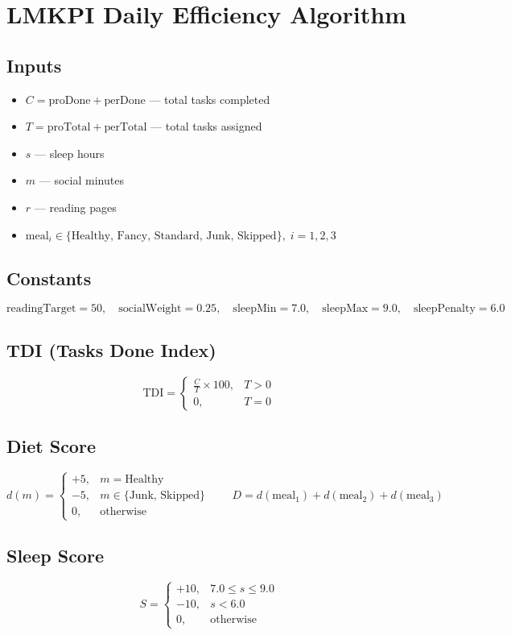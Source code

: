 \documentclass{article}
\begin{document}
\section*{LMKPI Daily Efficiency Algorithm}

\subsection*{Inputs}
\begin{itemize}
  \item $C = \text{proDone} + \text{perDone}$ — total tasks completed
  \item $T = \text{proTotal} + \text{perTotal}$ — total tasks assigned
  \item $s$ — sleep hours
  \item $m$ — social minutes
  \item $r$ — reading pages
  \item $\text{meal}_i \in \{\text{Healthy, Fancy, Standard, Junk, Skipped}\},\; i = 1,2,3$
\end{itemize}

\subsection*{Constants}
\[
\text{readingTarget} = 50,\quad \text{socialWeight} = 0.25,\quad \text{sleepMin} = 7.0,\quad \text{sleepMax} = 9.0,\quad \text{sleepPenalty} = 6.0
\]

\subsection*{TDI (Tasks Done Index)}
\[
\text{TDI} = \begin{cases}
\displaystyle\frac{C}{T} \times 100, & T > 0 \\[8pt]
0, & T = 0
\end{cases}
\]

\subsection*{Diet Score}
\[
d(m) = \begin{cases}
+5, & m = \text{Healthy} \\
-5, & m \in \{\text{Junk, Skipped}\} \\
0, & \text{otherwise}
\end{cases}
\qquad
D = d(\text{meal}_1) + d(\text{meal}_2) + d(\text{meal}_3)
\]

\subsection*{Sleep Score}
\[
S = \begin{cases}
+10, & 7.0 \le s \le 9.0 \\
-10, & s < 6.0 \\
0, & \text{otherwise}
\end{cases}
\]
\end{document}

